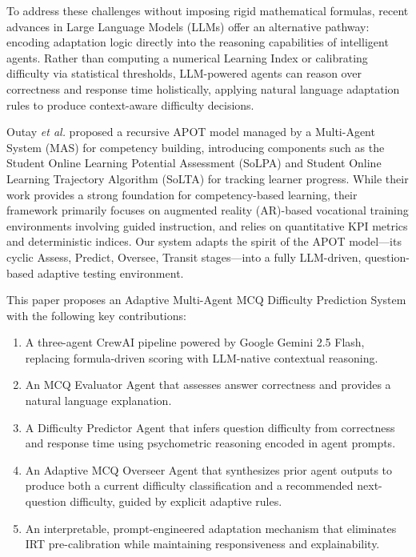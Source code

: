 \documentclass[conference]{IEEEtran}
\begin{document}
To address these challenges without imposing rigid mathematical formulas, recent advances in Large Language Models (LLMs) offer an alternative pathway: encoding adaptation logic directly into the reasoning capabilities of intelligent agents. Rather than computing a numerical Learning Index or calibrating difficulty via statistical thresholds, LLM-powered agents can reason over correctness and response time holistically, applying natural language adaptation rules to produce context-aware difficulty decisions.

Outay \textit{et al.} \cite{outay2024} proposed a recursive APOT model managed by a Multi-Agent System (MAS) for competency building, introducing components such as the Student Online Learning Potential Assessment (SoLPA) and Student Online Learning Trajectory Algorithm (SoLTA) for tracking learner progress. While their work provides a strong foundation for competency-based learning, their framework primarily focuses on augmented reality (AR)-based vocational training environments involving guided instruction, and relies on quantitative KPI metrics and deterministic indices. Our system adapts the spirit of the APOT model---its cyclic Assess, Predict, Oversee, Transit stages---into a fully LLM-driven, question-based adaptive testing environment.

This paper proposes an Adaptive Multi-Agent MCQ Difficulty Prediction System with the following key contributions:
\begin{enumerate}
    \item A three-agent CrewAI pipeline powered by Google Gemini 2.5 Flash, replacing formula-driven scoring with LLM-native contextual reasoning.
    \item An MCQ Evaluator Agent that assesses answer correctness and provides a natural language explanation.
    \item A Difficulty Predictor Agent that infers question difficulty from correctness and response time using psychometric reasoning encoded in agent prompts.
    \item An Adaptive MCQ Overseer Agent that synthesizes prior agent outputs to produce both a current difficulty classification and a recommended next-question difficulty, guided by explicit adaptive rules.
    \item An interpretable, prompt-engineered adaptation mechanism that eliminates IRT pre-calibration while maintaining responsiveness and explainability.
\end{enumerate}
\end{document}
